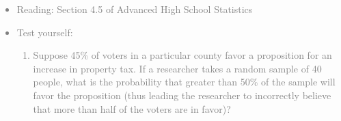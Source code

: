 \documentclass[11pt]{article}
\newcommand{\gray}[1]{\textcolor{gray}{#1}}
\begin{document}
\gray{
{\it
\vspace{-0.5cm}
\begin{itemize}
\renewcommand{\labelitemi}{{\textcolor{dark}{$\ast$}}}
\item Reading: Section 4.5 of Advanced High School Statistics
\item Test yourself: 
{\small
\begin{enumerate}
\item Suppose 45\% of voters in a particular county favor a proposition for an increase in property tax.  If a researcher takes a random sample of 40 people, what is the probability that greater than 50\% of the sample will favor the proposition (thus leading the researcher to incorrectly believe that more than half of the voters are in favor)?  
\end{enumerate}
}
\end{itemize}
}}
\end{document}
